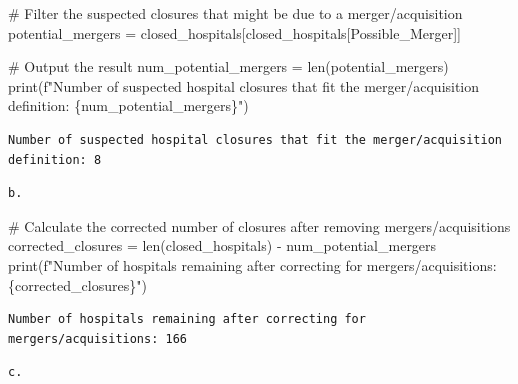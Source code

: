 \documentclass[
  letterpaper,
  DIV=11,
  numbers=noendperiod]{scrartcl}
\newenvironment{Shaded}{\begin{snugshade}}{\end{snugshade}}
\newcommand{\BuiltInTok}[1]{\textcolor[rgb]{0.00,0.23,0.31}{#1}}
\newcommand{\CommentTok}[1]{\textcolor[rgb]{0.37,0.37,0.37}{#1}}
\newcommand{\NormalTok}[1]{\textcolor[rgb]{0.00,0.23,0.31}{#1}}
\newcommand{\OperatorTok}[1]{\textcolor[rgb]{0.37,0.37,0.37}{#1}}
\newcommand{\SpecialCharTok}[1]{\textcolor[rgb]{0.37,0.37,0.37}{#1}}
\newcommand{\SpecialStringTok}[1]{\textcolor[rgb]{0.13,0.47,0.30}{#1}}
\newcommand{\StringTok}[1]{\textcolor[rgb]{0.13,0.47,0.30}{#1}}
\begin{document}
\begin{Shaded}
\begin{Highlighting}[]
\CommentTok{\# Filter the suspected closures that might be due to a merger/acquisition}
\NormalTok{potential\_mergers }\OperatorTok{=}\NormalTok{ closed\_hospitals[closed\_hospitals[}\StringTok{\textquotesingle{}Possible\_Merger\textquotesingle{}}\NormalTok{]]}

\CommentTok{\# Output the result}
\NormalTok{num\_potential\_mergers }\OperatorTok{=} \BuiltInTok{len}\NormalTok{(potential\_mergers)}
\BuiltInTok{print}\NormalTok{(}\SpecialStringTok{f"Number of suspected hospital closures that fit the merger/acquisition definition: }\SpecialCharTok{\{}\NormalTok{num\_potential\_mergers}\SpecialCharTok{\}}\SpecialStringTok{"}\NormalTok{)}
\end{Highlighting}
\end{Shaded}

\begin{verbatim}
Number of suspected hospital closures that fit the merger/acquisition definition: 8
\end{verbatim}

\begin{verbatim}
b.
\end{verbatim}

\begin{Shaded}
\begin{Highlighting}[]
\CommentTok{\# Calculate the corrected number of closures after removing mergers/acquisitions}
\NormalTok{corrected\_closures }\OperatorTok{=} \BuiltInTok{len}\NormalTok{(closed\_hospitals) }\OperatorTok{{-}}\NormalTok{ num\_potential\_mergers}
\BuiltInTok{print}\NormalTok{(}\SpecialStringTok{f"Number of hospitals remaining after correcting for mergers/acquisitions: }\SpecialCharTok{\{}\NormalTok{corrected\_closures}\SpecialCharTok{\}}\SpecialStringTok{"}\NormalTok{)}
\end{Highlighting}
\end{Shaded}

\begin{verbatim}
Number of hospitals remaining after correcting for mergers/acquisitions: 166
\end{verbatim}

\begin{verbatim}
c.
\end{verbatim}
\end{document}
